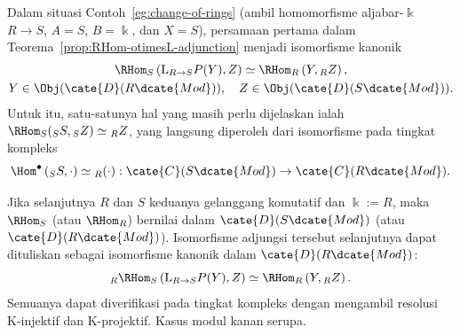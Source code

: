 \begin{contoh}\label{eg:change-of-ring-adjunction}
	Dalam situasi Contoh~\ref{eg:change-of-rings} (ambil homomorfisme
	aljabar-$\Bbbk$ $R\to S$, $A=S$, $B=\Bbbk$, dan $X=S$), persamaan pertama
	dalam Teorema~\ref{prop:RHom-otimesL-adjunction} menjadi isomorfisme kanonik
	\begin{gather*}
		\RHom_S\left( \mathrm{L} {}_{R \to S} P(Y), Z \right) \simeq \RHom_R\left( Y, {}_R Z \right), \\
		Y \in \Obj(\cate{D}(R\dcate{Mod})), \quad Z \in \Obj(\cate{D}(S\dcate{Mod})).
	\end{gather*}
	Untuk itu, satu-satunya hal yang masih perlu dijelaskan ialah
	$\RHom_S({}_S S,{}_S Z)\simeq{}_R Z$, yang langsung diperoleh dari
	isomorfisme pada tingkat kompleks
	\[ \Hom^\bullet\left({}_S S, \cdot\right) \simeq {}_R (\cdot) : \cate{C}(S\dcate{Mod}) \to \cate{C}(R\dcate{Mod}). \]
	
	Jika selanjutnya $R$ dan $S$ keduanya gelanggang komutatif dan
	$\Bbbk:=R$, maka $\RHom_S$ (atau $\RHom_R$) bernilai dalam
	$\cate{D}(S\dcate{Mod})$ (atau $\cate{D}(R\dcate{Mod})$). Isomorfisme
	adjungsi tersebut selanjutnya dapat dituliskan sebagai isomorfisme kanonik
	dalam $\cate{D}(R\dcate{Mod})$:
	\[ {}_R \RHom_S\left( \mathrm{L} {}_{R \to S} P(Y), Z \right) \simeq \RHom_R\left( Y, {}_R Z \right) . \]
	Semuanya dapat diverifikasi pada tingkat kompleks dengan mengambil
	resolusi K-injektif dan K-projektif. Kasus modul kanan serupa.
\end{contoh}


